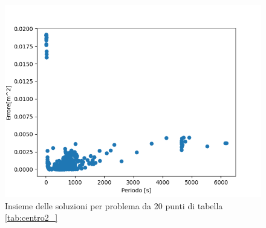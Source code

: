 \documentclass[a4paper,12pt]{report}
\begin{document}
\begin{itemize}
    \begin{figure}[H]
      \centering
      \includegraphics[scale=0.70]{img/puls0125/puntoUtopia20.png}
      \caption{Insieme delle soluzioni per problema da 20 punti di tabella \ref{tab:centro2_}}
      \label{fig:reg_ammis_20_0125}
    \end{figure}


\end{itemize}
\end{document}

